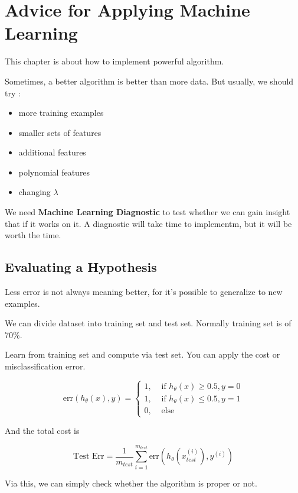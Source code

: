 \documentclass[en,11pt,english,black,simple]{../elegantbook}
\begin{document}
\fi 
\def\chapname{06improveyournn}

\chapter{Advice for Applying Machine Learning}

This chapter is about how to implement powerful algorithm. 

Sometimes, a better algorithm is better than more data. But usually, we should try :

\begin{itemize}
    \item more training examples
    \item smaller sets of features
    \item additional features 
    \item polynomial features
    \item changing \(\lambda\)
\end{itemize}

We need \textbf{Machine Learning Diagnostic} to test whether we can gain insight that if it works on it. A diagnostic will take time to implementm, but it will be worth the time.

\section{Evaluating a Hypothesis}

Less error is not always meaning better, for it's possible to generalize to new examples. 

We can divide dataset into training set and test set. Normally training set is of 70\%. 

Learn from training set and compute via test set. You can apply the cost or misclassification error. 

\[\text{err}(h_\theta(x), y ) = \left\{
\begin{aligned}
    1, & \text{ if } h_\theta(x) \geq 0.5, y = 0\\
    1, & \text{ if } h_\theta(x) \leq 0.5, y = 1\\
    0, & \text{ else }
\end{aligned}    
\right.\]

And the total cost is 

\[\text{Test Err} = \frac{1}{m_{test}} \sum_{i=1}^{m_{test}} {\text{err} (h_\theta(x_{test}^{(i)}), y^{(i)} )}\]

Via this, we can simply check whether the algorithm is proper or not.
\end{document}
